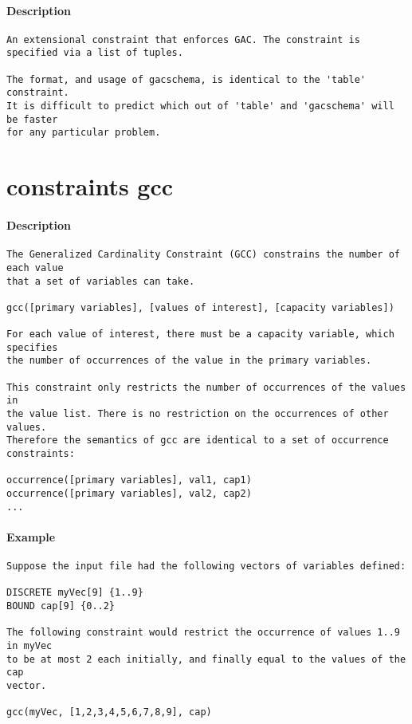 \paragraph{Description}
{\footnotesize
\begin{verbatim}
An extensional constraint that enforces GAC. The constraint is
specified via a list of tuples.

The format, and usage of gacschema, is identical to the 'table' constraint.
It is difficult to predict which out of 'table' and 'gacschema' will be faster
for any particular problem.
\end{verbatim}
}
\section{constraints gcc}
\paragraph{Description}
{\footnotesize
\begin{verbatim}
The Generalized Cardinality Constraint (GCC) constrains the number of each value
that a set of variables can take.

gcc([primary variables], [values of interest], [capacity variables])

For each value of interest, there must be a capacity variable, which specifies
the number of occurrences of the value in the primary variables.

This constraint only restricts the number of occurrences of the values in
the value list. There is no restriction on the occurrences of other values.
Therefore the semantics of gcc are identical to a set of occurrence
constraints:

occurrence([primary variables], val1, cap1)
occurrence([primary variables], val2, cap2)
...
\end{verbatim}
}
\paragraph{Example}
{\footnotesize
\begin{verbatim}
Suppose the input file had the following vectors of variables defined:

DISCRETE myVec[9] {1..9}
BOUND cap[9] {0..2}

The following constraint would restrict the occurrence of values 1..9 in myVec
to be at most 2 each initially, and finally equal to the values of the cap
vector.

gcc(myVec, [1,2,3,4,5,6,7,8,9], cap)
\end{verbatim}
}
